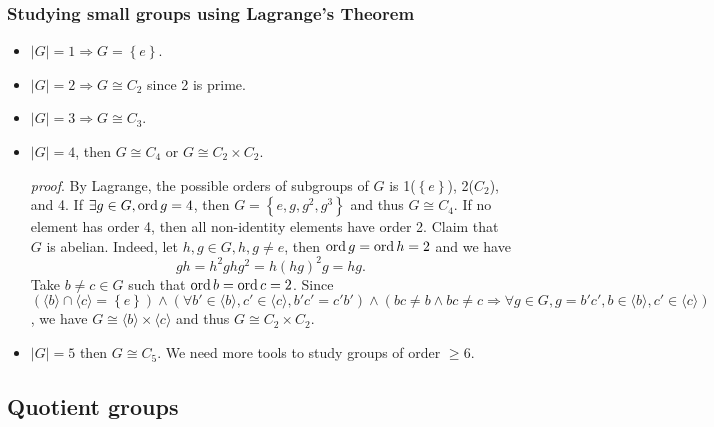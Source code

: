 \documentclass[a4paper]{article}
\begin{document}
    \subsubsection{Studying small groups using Lagrange's Theorem}
    \begin{example}
        \begin{itemize}
            \item $|G|=1 \Rightarrow G=\left\{ e\right\}$.
            \item $ |G|=2 \Rightarrow G \cong C_2 $ since 2 is prime.
            \item $|G|=3 \Rightarrow G \cong C_3$.
            \item $|G|=4$, then $ G \cong C_4 $ or $ G \cong C_2\times C_2 $.

            \textit{proof}. By Lagrange, the possible orders of subgroups of $G$ is 1($ \left\{ e\right\} $), 2($C_2$), and 4. If $ \exists g\in G, \operatorname{ord} g=4$, then $ G=\left\{ e,g,g^2,g^3\right\} $ and thus $ G \cong C_4 $. If no element has order 4, then all non-identity elements have order 2. Claim that $G$ is abelian. Indeed, let $ h,g\in G, h,g\neq e $, then $ \operatorname{ord} g=\operatorname{ord} h=2 $ and we have 
            \[
                gh=h^2ghg^2=h(hg)^2g=hg
            .\]
            Take $ b\neq c\in G $ such that $\operatorname{ord} b=\operatorname{ord} c=2$. Since $ (\langle b \rangle \cap \langle c \rangle = \left\{ e\right\}) \land (\forall b'\in \langle b \rangle,c'\in \langle c \rangle, b'c'=c'b') \land (bc\neq b \land bc\neq c \Rightarrow \forall g\in G, g=b'c', b\in \langle b \rangle, c'\in \langle c \rangle  )   $, we have $ G \cong \langle b \rangle \times \langle c \rangle $ and thus $ G \cong C_2 \times C_2 $.
            \item $ |G|=5 $ then $ G \cong C_5 $. We need more tools to study groups of order $ \ge 6 $.
        \end{itemize}
    \end{example}
    \subsection{Quotient groups}
\end{document}
